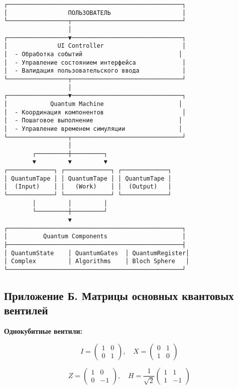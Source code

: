 \documentclass[14pt,russian]{extarticle}
\begin{document}
\begin{verbatim}
┌─────────────────────────────────────────────────┐
│                 ПОЛЬЗОВАТЕЛЬ                    │
└─────────────────┬───────────────────────────────┘
                  │
┌─────────────────▼───────────────────────────────┐
│              UI Controller                      │
│  - Обработка событий                           │
│  - Управление состоянием интерфейса             │
│  - Валидация пользовательского ввода            │
└─────────────────┬───────────────────────────────┘
                  │
┌─────────────────▼───────────────────────────────┐
│            Quantum Machine                     │
│  - Координация компонентов                      │
│  - Пошаговое выполнение                        │
│  - Управление временем симуляции               │
└─────────────────┬───────────────────────────────┘
                  │
        ┌─────────┼─────────┐
        ▼         ▼         ▼
┌─────────────┐ ┌─────────────┐ ┌─────────────┐
│ QuantumTape │ │ QuantumTape │ │ QuantumTape │
│  (Input)    │ │   (Work)    │ │  (Output)   │
└─────────────┘ └─────────────┘ └─────────────┘
        │         │         │
        └─────────┼─────────┘
                  ▼
┌─────────────────────────────────────────────────┐
│          Quantum Components                     │
├─────────────────────────────────────────────────┤
│ QuantumState    │ QuantumGates  │ QuantumRegister│
│ Complex         │ Algorithms    │ Bloch Sphere   │
└─────────────────────────────────────────────────┘
\end{verbatim}

\subsection{Приложение Б. Матрицы основных квантовых вентилей}

\textbf{Однокубитные вентили:}

$$I = \begin{pmatrix} 1 & 0 \\ 0 & 1 \end{pmatrix}, \quad
  X = \begin{pmatrix} 0 & 1 \\ 1 & 0 \end{pmatrix}$$

$$Z = \begin{pmatrix} 1 & 0 \\ 0 & -1 \end{pmatrix}, \quad
  H = \frac{1}{\sqrt{2}}\begin{pmatrix} 1 & 1 \\ 1 & -1 \end{pmatrix}$$
\end{document}
